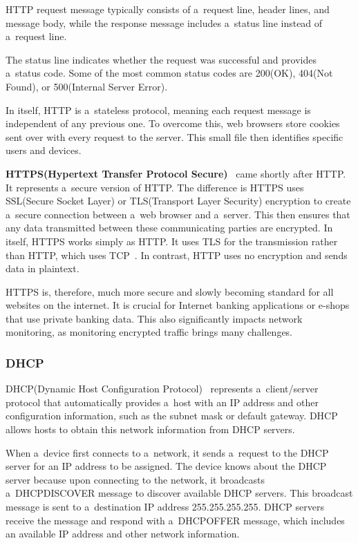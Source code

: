 \documentclass[
  printed,     %
  color,       %
  oneside,     %
  nosansbold,  %
  nocolorbold, %
  nolof,         %
  nolot,         %
]{fithesis4}
\begin{document}
HTTP request message typically consists of a~request line, header lines, and message body, while the response message includes a~status line instead of a~request line.

The status line indicates whether the request was successful and provides a~status code. Some of the most common status codes are 200(OK), 404(Not Found), or 500(Internal Server Error).

In itself, HTTP is a~stateless protocol, meaning each request message is independent of any previous one. To overcome this, web browsers store cookies sent over with every request to the server. This small file then identifies specific users and devices.

\medskip

\textbf{HTTPS(Hypertext Transfer Protocol Secure)}~\cite{10.5555/2584507} came shortly after HTTP. It represents a~secure version of HTTP. The difference is HTTPS uses SSL(Secure Socket Layer) or TLS(Transport Layer Security) encryption to create a~secure connection between a~web browser and a~server. This then ensures that any data transmitted between these communicating parties are encrypted. In itself, HTTPS works simply as HTTP. It uses TLS for the transmission rather than HTTP, which uses TCP~\cite{RFC2818}. In contrast, HTTP uses no encryption and sends data in plaintext.

HTTPS is, therefore, much more secure and slowly becoming standard for all websites on the internet. It is crucial for Internet banking applications or e-shops that use private banking data. This also significantly impacts network monitoring, as monitoring encrypted traffic brings many challenges.

\subsubsection{DHCP}

DHCP(Dynamic Host Configuration Protocol)~\cite{RFC2131} represents a~client/server protocol that automatically provides a~host with an IP address and other configuration information, such as the subnet mask or default gateway. DHCP allows hosts to obtain this network information from DHCP servers.

When a~device first connects to a~network, it sends a~request to the DHCP server for an IP address to be assigned. The device knows about the DHCP server because upon connecting to the network, it broadcasts a~DHCPDISCOVER message to discover available DHCP servers. This broadcast message is sent to a~destination IP address 255.255.255.255. DHCP servers receive the message and respond with a~DHCPOFFER message, which includes an available IP address and other network information.
\end{document}
